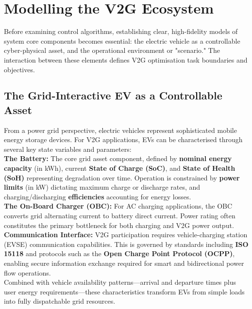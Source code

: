 \section{Modelling the V2G Ecosystem}
\label{sec:ev_and_scenario}

Before examining control algorithms, establishing clear, high-fidelity models of system core components becomes essential: the electric vehicle as a controllable cyber-physical asset, and the operational environment or "scenario." The interaction between these elements defines V2G optimisation task boundaries and objectives.

\subsection{The Grid-Interactive EV as a Controllable Asset}

From a power grid perspective, electric vehicles represent sophisticated mobile energy storage devices. For V2G applications, EVs can be characterised through several key state variables and parameters:
\\
\noindent
    \textbf{The Battery:} The core grid asset component, defined by \textbf{nominal energy capacity} (in kWh), current \textbf{State of Charge (SoC)}, and \textbf{State of Health (SoH)} representing degradation over time. Operation is constrained by \textbf{power limits} (in kW) dictating maximum charge or discharge rates, and charging/discharging \textbf{efficiencies} accounting for energy losses.
    \\
    \noindent
    \textbf{The On-Board Charger (OBC):} For AC charging applications, the OBC converts grid alternating current to battery direct current. Power rating often constitutes the primary bottleneck for both charging and V2G power output.
    \\
\noindent    
  \textbf{Communication Interface:} V2G participation requires vehicle-charging station (EVSE) communication capabilities. This is governed by standards including \textbf{ISO 15118} and protocols such as the \textbf{Open Charge Point Protocol (OCPP)}, enabling secure information exchange required for smart and bidirectional power flow operations.
\\
\noindent
Combined with vehicle availability patterns—arrival and departure times plus user energy requirements—these characteristics transform EVs from simple loads into fully dispatchable grid resources.
\newpage

